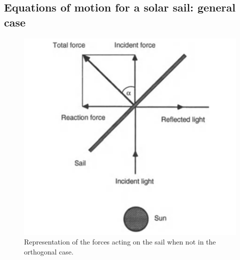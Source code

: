 \documentclass[twocolumn,12pt,a4paper]{article}
\numberwithin{equation}{section}
\begin{document}
\subsection{Equations of motion for a solar sail: general case}
\begin{figure}
	\centering
	\includegraphics[scale=.4]{alpha}
	\caption{Representation of the forces acting on the sail when not in the orthogonal case. \cite{mcinnes}}
	\label{alpha}
\end{figure}
\end{document}
